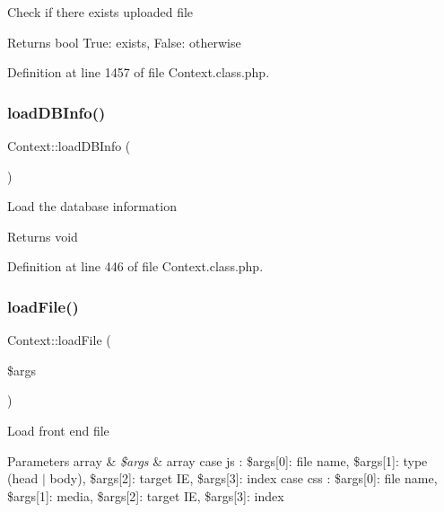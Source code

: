 Check if there exists uploaded file

\begin{DoxyReturn}{Returns}
bool True\+: exists, False\+: otherwise 
\end{DoxyReturn}


Definition at line 1457 of file Context.\+class.\+php.

\mbox{\label{classContext_af9a710b382c01e18ddabc728d04f5667}} 
\subsubsection{\texorpdfstring{load\+D\+B\+Info()}{loadDBInfo()}}
{\footnotesize\ttfamily Context\+::load\+D\+B\+Info (\begin{DoxyParamCaption}{ }\end{DoxyParamCaption})}

Load the database information

\begin{DoxyReturn}{Returns}
void 
\end{DoxyReturn}


Definition at line 446 of file Context.\+class.\+php.

\mbox{\label{classContext_a01ddbd076a74f16dc46d3c7b358daea6}} 
\subsubsection{\texorpdfstring{load\+File()}{loadFile()}}
{\footnotesize\ttfamily Context\+::load\+File (\begin{DoxyParamCaption}\item[{}]{\$args }\end{DoxyParamCaption})}

Load front end file


\begin{DoxyParams}[1]{Parameters}
array & {\em \$args} & array case js \+: \$args\mbox{[}0\mbox{]}\+: file name, \$args\mbox{[}1\mbox{]}\+: type (head $\vert$ body), \$args\mbox{[}2\mbox{]}\+: target IE, \$args\mbox{[}3\mbox{]}\+: index case css \+: \$args\mbox{[}0\mbox{]}\+: file name, \$args\mbox{[}1\mbox{]}\+: media, \$args\mbox{[}2\mbox{]}\+: target IE, \$args\mbox{[}3\mbox{]}\+: index \\
\hline
\end{DoxyParams}


